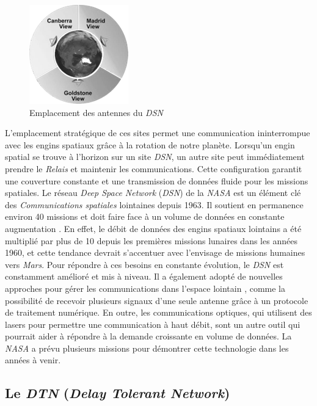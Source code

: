 \documentclass[conference]{IEEEtran}
\begin{document}
\begin{figure}[htbp]
\centerline{\includegraphics[scale=1.1]{Image1.png}}
\caption{Emplacement des antennes du \emph{DSN} \cite{b2}}
\label{fig:locations}
\end{figure}
L'emplacement stratégique de ces sites permet une communication ininterrompue avec les engins spatiaux grâce à la rotation de notre planète. Lorsqu'un engin spatial se trouve à l'horizon sur un site \emph{DSN}, un autre site peut immédiatement prendre le \emph{Relais} et maintenir les communications. Cette configuration garantit une couverture constante et une transmission de données fluide pour les missions spatiales.
\newline Le réseau \emph{Deep Space Network} (\emph{DSN}) de la \emph{NASA} est un élément clé des \emph{Communications spatiales} lointaines depuis 1963. Il soutient en permanence environ 40 missions et doit faire face à un volume de données en constante augmentation \cite{b3}. En effet, le débit de données des engins spatiaux lointains a été multiplié par plus de 10 depuis les premières missions lunaires dans les années 1960, et cette tendance devrait s'accentuer avec l'envisage de missions humaines vers \emph{Mars}. Pour répondre à ces besoins en constante évolution, le \emph{DSN} est constamment amélioré et mis à niveau. Il a également adopté de nouvelles approches pour gérer les communications dans l'espace lointain \cite{b4}, comme la possibilité de recevoir plusieurs signaux d'une seule antenne grâce à un protocole de traitement numérique.
En outre, les communications optiques, qui utilisent des lasers pour permettre une communication à haut débit, sont un autre outil qui pourrait aider à répondre à la demande croissante en volume de données. La \emph{NASA} a prévu plusieurs missions pour démontrer cette technologie dans les années à venir.

\subsection{Le \emph{DTN} (\emph{Delay Tolerant Network})}
\end{document}
